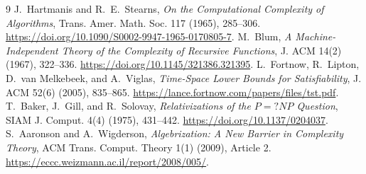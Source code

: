 \documentclass[11pt]{article}
\begin{document}
\begin{thebibliography}{9}
 J.~Hartmanis and R.~E.~Stearns,
\emph{On the Computational Complexity of Algorithms}, Trans. Amer. Math.
Soc. 117 (1965), 285--306.
\url{https://doi.org/10.1090/S0002-9947-1965-0170805-7}.
 M.~Blum,
\emph{A Machine-Independent Theory of the Complexity of Recursive Functions},
J. ACM 14(2) (1967), 322--336.
\url{https://doi.org/10.1145/321386.321395}.
 L.~Fortnow, R.~Lipton, D.~van Melkebeek, and A.~Viglas,
\emph{Time-Space Lower Bounds for Satisfiability}, J. ACM 52(6) (2005),
835--865. \url{https://lance.fortnow.com/papers/files/tst.pdf}.
 T.~Baker, J.~Gill, and R.~Solovay,
\emph{Relativizations of the $P=?NP$ Question}, SIAM J. Comput. 4(4)
(1975), 431--442. \url{https://doi.org/10.1137/0204037}.
 S.~Aaronson and A.~Wigderson,
\emph{Algebrization: A New Barrier in Complexity Theory}, ACM Trans.
Comput. Theory 1(1) (2009), Article 2.
\url{https://eccc.weizmann.ac.il/report/2008/005/}.
\end{thebibliography}
\end{document}
